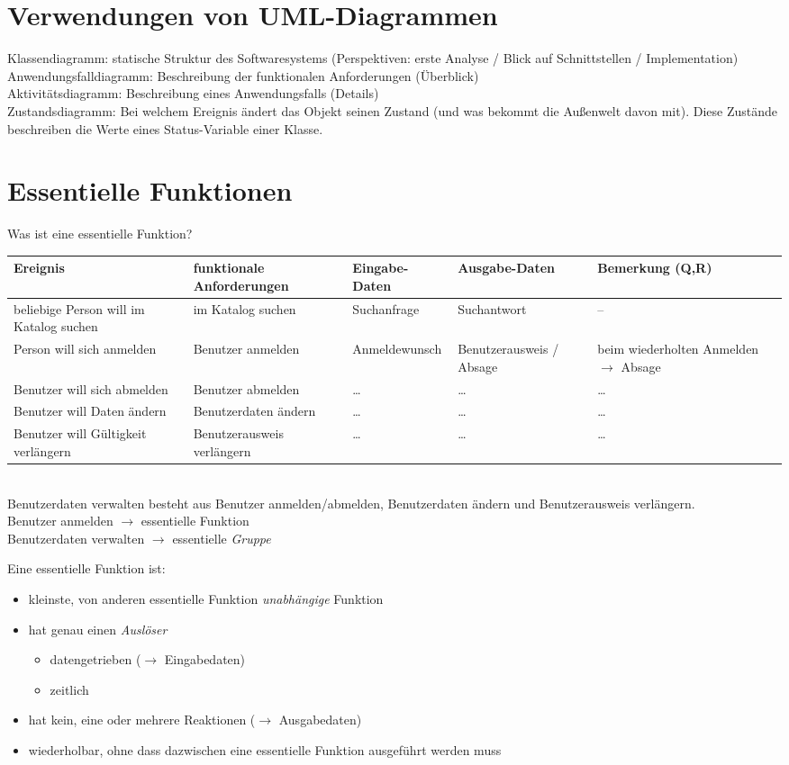 \section{Verwendungen von UML-Diagrammen}
Klassendiagramm: statische Struktur des Softwaresystems (Perspektiven: erste Analyse / Blick auf Schnittstellen / Implementation)\\
Anwendungsfalldiagramm: Beschreibung der funktionalen Anforderungen (Überblick)\\
Aktivitätsdiagramm: Beschreibung eines Anwendungsfalls (Details)\\
Zustandsdiagramm: Bei welchem Ereignis ändert das Objekt seinen Zustand (und was bekommt die Außenwelt davon mit). Diese Zustände beschreiben die Werte eines Status-Variable einer Klasse.

\section{Essentielle Funktionen}
Was ist eine essentielle Funktion?\\
\begin{tabular}{L{.2} | L{.2} | L{.15} | L{.15} | L{.25}}
Ereignis & funktionale Anforderungen & Eingabe-Daten & Ausgabe-Daten &Bemerkung (Q,R)\\
\hline\hline
beliebige Person will im Katalog suchen & im Katalog suchen & Suchanfrage & Suchantwort & --\\\hline
Person will sich anmelden & Benutzer anmelden & Anmeldewunsch & Benutzerausweis / Absage & beim wiederholten Anmelden $\to$ Absage\\\hline
Benutzer will sich abmelden & Benutzer abmelden & … & … & …\\\hline
Benutzer will Daten ändern & Benutzerdaten ändern & … & … & …\\\hline
Benutzer will Gültigkeit verlängern & Benutzerausweis verlängern & … & … & …
\end{tabular}\\
Benutzerdaten verwalten besteht aus Benutzer anmelden/abmelden, Benutzerdaten ändern und Benutzerausweis verlängern.\\
Benutzer anmelden $\to$ essentielle Funktion\\
Benutzerdaten verwalten $\to$ essentielle \emph{Gruppe}\\\bigskip

Eine essentielle Funktion ist:
\begin{itemize}
\item kleinste, von anderen essentielle Funktion \emph{unabhängige} Funktion
\item hat genau einen \emph{Auslöser}
\begin{itemize}
\item datengetrieben ($\to$ Eingabedaten)
\item zeitlich
\end{itemize}
\item hat kein, eine oder mehrere Reaktionen ($\to$ Ausgabedaten)
\item wiederholbar, ohne dass dazwischen eine essentielle Funktion ausgeführt werden muss
\end{itemize}

